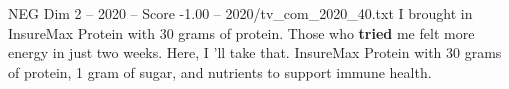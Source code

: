 \begin{textsample}{NEG Dim 2 – 2020 – Score -1.00 – 2020/tv\_com\_2020\_40.txt}  \label{ex:f2_neg_037}
I brought in InsureMax Protein with 30 grams of protein.
Those who \textbf{tried} me felt more energy in just two weeks.
Here, I 'll take that.
InsureMax Protein with 30 grams of protein, 1 gram of sugar, and nutrients to support immune health.

\end{textsample}
